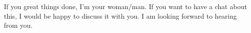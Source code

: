 If you great things done, I'm your woman/man.
If you want to have a chat about this, I would be happy to discuss it with you.
I am looking forward to hearing from you.